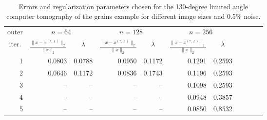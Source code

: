 \begin{table}[htp]
\caption{Errors and regularization parameters chosen for the 130-degree limited angle computer tomography of the grains example for different image sizes and 0.5\% noise.}
\begin{center}
\begin{tabular}{|r|r|r|r|r|r|r|r|r|r|r|}
\hline
\multicolumn{1}{|c|}{outer} & \multicolumn{2}{c|}{$n = 64$} & \multicolumn{2}{c|}{$n = 128$} & \multicolumn{2}{c|}{$n = 256$} \\\cline{2-7}
\multicolumn{1}{|c|}{iter.} & \multicolumn{1}{c|}{$\frac{\|x - x^{(*,\ell)}\|_2}{\|x\|_2}$}& \multicolumn{1}{c|}{$\lambda$} & \multicolumn{1}{c|}{$\frac{\|x - x^{(*,\ell)}\|_2}{\|x\|_2}$} & \multicolumn{1}{c|}{$\lambda$} & \multicolumn{1}{c|}{$\frac{\|x - x^{(*,\ell)}\|_2}{\|x\|_2}$} & \multicolumn{1}{c|}{$\lambda$} \\
\hline
1 & 0.0803 & 0.0788 & 0.0950 & 0.1172 & 0.1291 & 0.2593 \\
2 & 0.0646 & 0.1172 & 0.0836 & 0.1743 & 0.1196 & 0.2593 \\
3 & -- & -- & -- & -- & 0.1098 & 0.2593 \\
4 & -- & -- & -- & -- & 0.0948 & 0.3857 \\
5 & -- & -- & -- & -- & 0.0850 & 0.8532 \\
\hline
\end{tabular}
\end{center}
\label{tab:limited_angle_errs_and_reg_params}
\end{table}%
